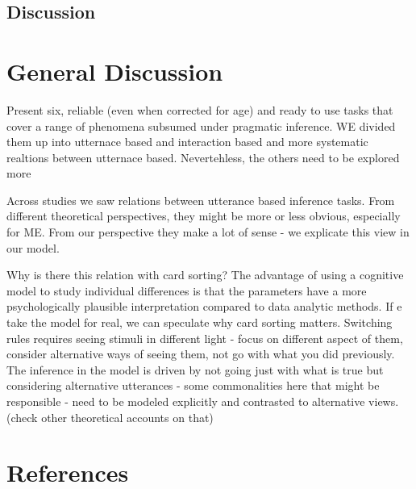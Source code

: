 \documentclass[
  english,
  man,floatsintext]{apa6}
\begin{document}
\hypertarget{discussion-2}{%
\subsection{Discussion}\label{discussion-2}}

\hypertarget{general-discussion}{%
\section{General Discussion}\label{general-discussion}}

Present six, reliable (even when corrected for age) and ready to use tasks that cover a range of phenomena subsumed under pragmatic inference. WE divided them up into utternace based and interaction based and more systematic realtions between utternace based. Nevertehless, the others need to be explored more

Across studies we saw relations between utterance based inference tasks. From different theoretical perspectives, they might be more or less obvious, especially for ME. From our perspective they make a lot of sense - we explicate this view in our model.

Why is there this relation with card sorting? The advantage of using a cognitive model to study individual differences is that the parameters have a more psychologically plausible interpretation compared to data analytic methods. If e take the model for real, we can speculate why card sorting matters. Switching rules requires seeing stimuli in different light - focus on different aspect of them, consider alternative ways of seeing them, not go with what you did previously. The inference in the model is driven by not going just with what is true but considering alternative utterances - some commonalities here that might be responsible - need to be modeled explicitly and contrasted to alternative views. (check other theoretical accounts on that)

\newpage

\hypertarget{references}{%
\section{References}\label{references}}

\begingroup
\setlength{\parindent}{-0.5in}
\setlength{\leftskip}{0.5in}
\end{document}

